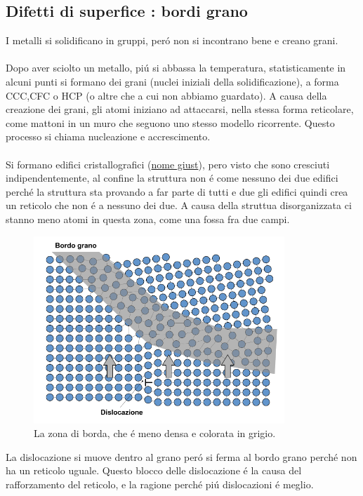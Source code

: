 \documentclass{article}
\begin{document}
        \subsection{Difetti di superfice : bordi grano}
            I metalli si solidificano in gruppi, per\'o non si incontrano bene e creano grani. \\ \\
            Dopo aver sciolto un metallo, pi\'u si abbassa la temperatura, statisticamente in alcuni punti si formano dei grani (nuclei iniziali della solidificazione), a forma CCC,CFC o HCP (o altre che a cui non abbiamo guardato). A causa della creazione dei grani, gli atomi iniziano ad attaccarsi, nella stessa forma reticolare, come mattoni in un muro che seguono uno stesso modello ricorrente. Questo processo si chiama nucleazione e accrescimento.\\ \\
            Si formano edifici cristallografici (\underline{nome giust}), pero visto che sono cresciuti indipendentemente, al confine la struttura non \'e come nessuno dei due edifici perch\'e la struttura sta provando a far parte di tutti e due gli edifici quindi crea un reticolo che non \'e a nessuno dei due. A causa della struttua disorganizzata ci stanno meno atomi in questa zona, come una fossa fra due campi.
            \begin{figure}
                \centering
                \includegraphics{Diagramma bordo grano.png}
                \caption{La zona di borda, che \'e meno densa e colorata in grigio.}
            \end{figure}
            La dislocazione si muove dentro al grano per\'o si ferma al bordo grano perch\'e non ha un reticolo uguale. Questo blocco delle dislocazione \'e la causa del rafforzamento del reticolo, e la ragione perch\'e pi\'u dislocazioni \'e meglio.
\end{document}
